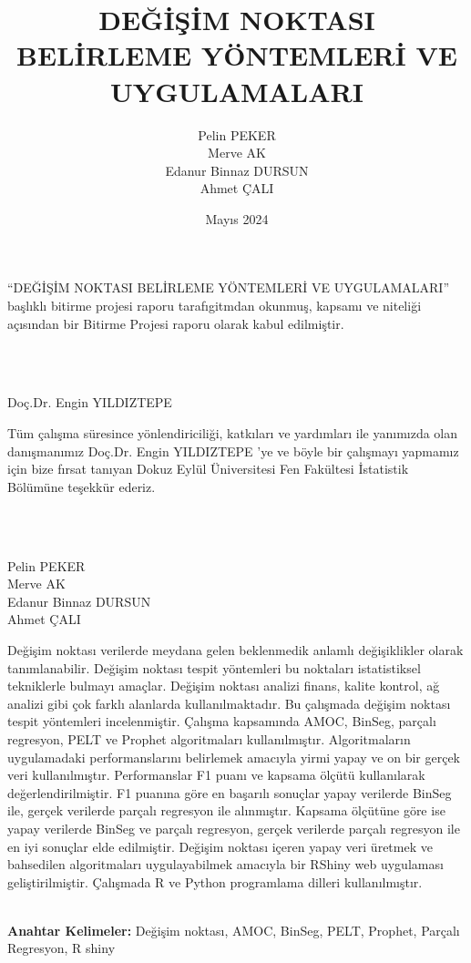 \documentclass[12pt,twoside]{deuthesis}
\title{DEĞİŞİM NOKTASI BELİRLEME YÖNTEMLERİ VE UYGULAMALARI}
\author{Pelin PEKER \\ Merve AK \\ Edanur Binnaz DURSUN \\ Ahmet ÇALI} %
\date{Mayıs 2024}
\begin{document}
  \maketitle

\frontmatter %
\pagestyle{empty} %

\begin{preface}
	``DEĞİŞİM NOKTASI BELİRLEME YÖNTEMLERİ VE UYGULAMALARI'' başlıklı bitirme projesi raporu tarafıgitmdan okunmuş, kapsamı ve niteliği açısından bir Bitirme Projesi raporu olarak kabul edilmiştir.\\
\strut \\
\strut \\
Doç.Dr. Engin YILDIZTEPE
\end{preface}

  \begin{acknowledgements}
    Tüm çalışma süresince yönlendiriciliği, katkıları ve yardımları ile yanımızda olan danışmanımız Doç.Dr. Engin YILDIZTEPE 'ye ve böyle bir çalışmayı yapmamız için bize fırsat tanıyan Dokuz Eylül Üniversitesi Fen Fakültesi İstatistik Bölümüne teşekkür ederiz.\\
    \strut \\
    \strut \\
    Pelin PEKER\\
    Merve AK\\
    Edanur Binnaz DURSUN\\
    Ahmet ÇALI\\
  \end{acknowledgements}

\begin{abstractTR}
	Değişim noktası verilerde meydana gelen beklenmedik anlamlı değişiklikler olarak tanımlanabilir. Değişim noktası tespit yöntemleri bu noktaları istatistiksel tekniklerle bulmayı amaçlar. Değişim noktası analizi finans, kalite kontrol, ağ analizi gibi çok farklı alanlarda kullanılmaktadır. Bu çalışmada değişim noktası tespit yöntemleri incelenmiştir. Çalışma kapsamında AMOC, BinSeg, parçalı regresyon, PELT ve Prophet algoritmaları kullanılmıştır. Algoritmaların uygulamadaki performanslarını belirlemek amacıyla yirmi yapay ve on bir gerçek veri kullanılmıştır. Performanslar F1 puanı ve kapsama ölçütü kullanılarak değerlendirilmiştir. F1 puanına göre en başarılı sonuçlar yapay verilerde BinSeg ile, gerçek verilerde parçalı regresyon ile alınmıştır. Kapsama ölçütüne göre ise yapay verilerde BinSeg ve parçalı regresyon, gerçek verilerde parçalı regresyon ile en iyi sonuçlar elde edilmiştir. Değişim noktası içeren yapay veri üretmek ve bahsedilen algoritmaları uygulayabilmek amacıyla bir RShiny web uygulaması geliştirilmiştir. Çalışmada R ve Python programlama dilleri kullanılmıştır.\\
\strut \\

\textbf{Anahtar Kelimeler:} Değişim noktası, AMOC, BinSeg, PELT, Prophet, Parçalı Regresyon, R shiny
\end{abstractTR}
\end{document}
